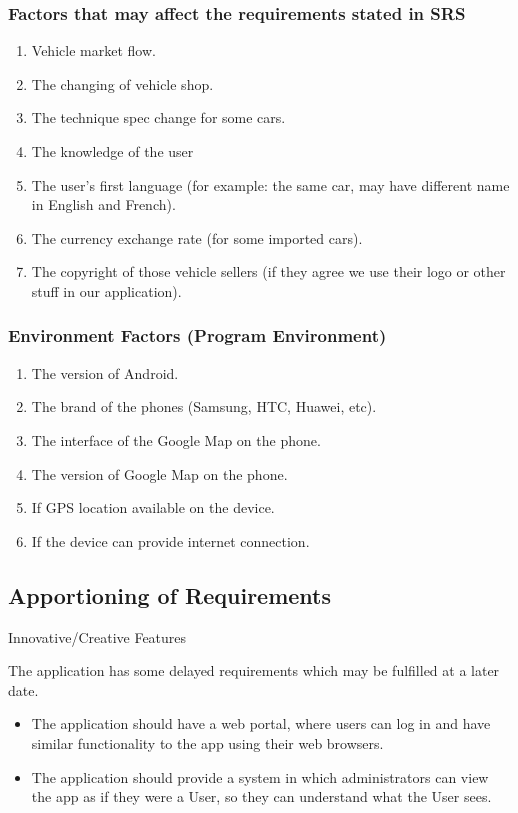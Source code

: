 \documentclass[12pt]{article}
\begin{document}
\subsubsection{Factors that may affect the requirements stated in SRS}
\begin{enumerate}
    \item Vehicle market flow.
    \item The changing of vehicle shop.
    \item The technique spec change for some cars.
    \item The knowledge of the user
    \item The user's first language (for example: the same car, may have different name in English and French).
    \item The currency exchange rate (for some imported cars).
    \item The copyright of those vehicle sellers (if they agree we use their logo or other stuff in our application).
\end{enumerate}

\subsubsection{Environment Factors (Program Environment)}
\begin{enumerate}
    \item The version of Android.
	\item The brand of the phones (Samsung, HTC, Huawei, etc).
    \item The interface of the Google Map on the phone.
	\item The version of Google Map on the phone.
	\item If GPS location available on the device.
	\item If the device can provide internet connection.
\end{enumerate}

\subsection{Apportioning of Requirements}
Innovative/Creative Features

The application has some delayed requirements which may be fulfilled at a later date.
\begin{itemize}
    \item The application should have a web portal, where users can log in and have similar functionality to the app using their web browsers.
    \item The application should provide a system in which administrators can view the app as if they were a User, so they can understand what the User sees.
\end{itemize}
\end{document}
